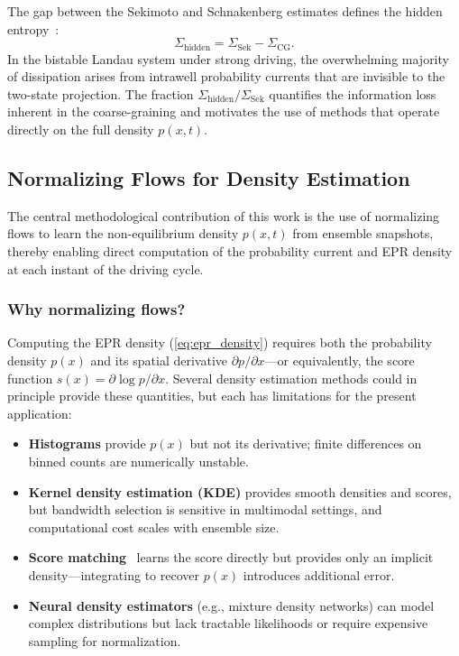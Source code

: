 The gap between the Sekimoto and Schnakenberg estimates defines the hidden entropy~\cite{Esposito2012,Busiello2019}:
\begin{equation}
    \Sigma_{\mathrm{hidden}} = \Sigma_{\mathrm{Sek}} - \Sigma_{\mathrm{CG}}.
    \label{eq:hidden_entropy}
\end{equation}
In the bistable Landau system under strong driving, the overwhelming majority of dissipation arises from intrawell probability currents that are invisible to the two-state projection.
The fraction $\Sigma_{\mathrm{hidden}}/\Sigma_{\mathrm{Sek}}$ quantifies the information loss inherent in the coarse-graining and motivates the use of methods that operate directly on the full density $p(x,t)$.


\subsection{Normalizing Flows for Density Estimation}
\label{sec:nf_density}

The central methodological contribution of this work is the use of normalizing flows to learn the non-equilibrium density $p(x,t)$ from ensemble snapshots, thereby enabling direct computation of the probability current and EPR density at each instant of the driving cycle.

\subsubsection{Why normalizing flows?}
\label{sec:why_nf}

Computing the EPR density (\cref{eq:epr_density}) requires both the probability density $p(x)$ and its spatial derivative $\partial p/\partial x$---or equivalently, the score function $s(x) = \partial\log p/\partial x$.
Several density estimation methods could in principle provide these quantities, but each has limitations for the present application:
\begin{itemize}
    \item \textbf{Histograms} provide $p(x)$ but not its derivative; finite differences on binned counts are numerically unstable.
    \item \textbf{Kernel density estimation (KDE)} provides smooth densities and scores, but bandwidth selection is sensitive in multimodal settings, and computational cost scales with ensemble size.
    \item \textbf{Score matching}~\cite{Boffi2024,Boffi2022} learns the score directly but provides only an implicit density---integrating to recover $p(x)$ introduces additional error.
    \item \textbf{Neural density estimators} (e.g., mixture density networks) can model complex distributions but lack tractable likelihoods or require expensive sampling for normalization.
\end{itemize}

